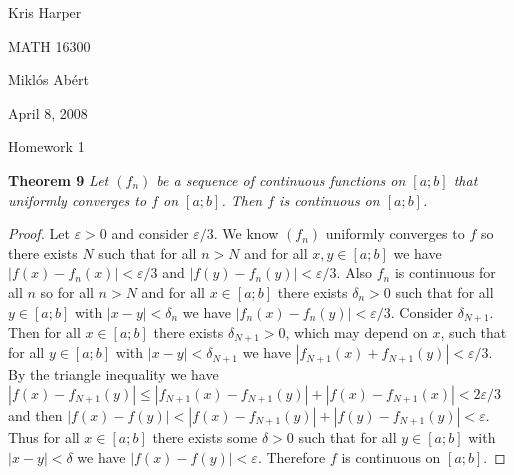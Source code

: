 \documentclass{article}
\begin{document}
\begin{flushright}
Kris Harper

MATH 16300

Mikl\'{o}s Ab\'{e}rt

April 8, 2008
\end{flushright}

\begin{center}
Homework 1
\end{center}

\begin{flushleft}

\textbf{Theorem 9}
\textsl{Let $(f_n)$ be a sequence of continuous functions on $[a;b]$ that uniformly converges to $f$ on $[a;b]$. Then $f$ is continuous on $[a;b]$.}
\begin{proof}
Let $\varepsilon > 0$ and consider $\varepsilon/3$. We know $(f_n)$ uniformly converges to $f$ so there exists $N$ such that for all $n>N$ and for all $x,y \in [a;b]$ we have $|f(x)-f_n(x)| < \varepsilon/3$ and $|f(y)-f_n(y)| < \varepsilon/3$. Also $f_n$ is continuous for all $n$ so for all $n>N$ and for all $x \in [a;b]$ there exists $\delta_n > 0$ such that for all $y \in [a;b]$ with $|x-y| < \delta_n$ we have $|f_n(x) - f_n(y)| < \varepsilon/3$. Consider $\delta_{N+1}$. Then for all $x \in [a;b]$ there exists $\delta_{N+1} > 0$, which may depend on $x$, such that for all $y \in [a;b]$ with $|x-y| < \delta_{N+1}$ we have $|f_{N+1}(x)+f_{N+1}(y)| < \varepsilon/3$. By the triangle inequality we have $|f(x)-f_{N+1}(y)| \leq |f_{N+1}(x)-f_{N+1}(y)| + |f(x)-f_{N+1}(x)| < 2\varepsilon/3$ and then $|f(x)-f(y)| < |f(x)-f_{N+1}(y)| + |f(y)-f_{N+1}(y)| < \varepsilon$. Thus for all $x \in [a;b]$ there exists some $\delta > 0$ such that for all $y \in [a;b]$ with $|x-y| < \delta$ we have $|f(x)-f(y)| < \varepsilon$. Therefore $f$ is continuous on $[a;b]$.
\end{proof}


\end{flushleft}
\end{document}
